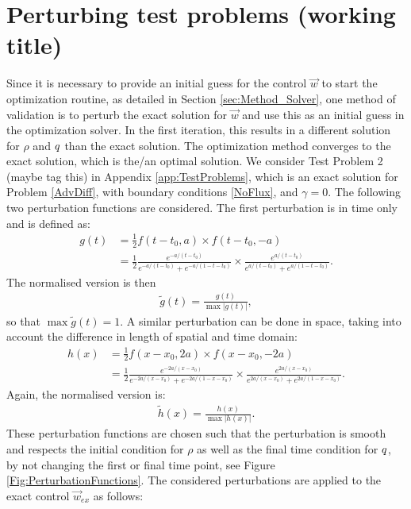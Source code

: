 \section{Perturbing test problems (working title)} \label{app:TestProblemsPerturbed}

Since it is necessary to provide an initial guess for the control $\vec{w}$ to start the optimization routine, as detailed in Section \ref{sec:Method_Solver}, one method of validation is to perturb the exact solution for $\vec{w}$ and use this as an initial guess in the optimization solver. In the first iteration, this results in a different solution for $\rho$ and $q$ than the exact solution. The optimization method  converges to the exact solution, which is the/an optimal solution. We consider Test Problem 2 (maybe tag this) in Appendix \ref{app:TestProblems}, which is an exact solution for Problem \eqref{AdvDiff}, with boundary conditions \eqref{NoFlux}, and $\gamma = 0$. 
The following two perturbation functions are considered. The first perturbation is in time only and is defined as:
\begin{align*}
g(t) &= \frac{1}{2} f(t-t_0, a) \times f(t-t_0, -a)\\
&= \frac{1}{2} \frac{e^{-a/(t-t_0)}}{e^{-a/(t-t_0)} + e^{-a/(1-t -t_0)}} \times \frac{e^{a/(t-t_0)}}{e^{a/(t-t_0)} + e^{a/(1-t - t_0)}}.
\end{align*}
The normalised version is then 
\begin{align*}
\tilde g(t) = \frac{g(t)}{\max{|{g(t)}|}},
\end{align*}
so that $\max{\tilde g(t)} =1$.
A similar perturbation can be done in space, taking into account the difference in length of spatial and time domain:
\begin{align*}
h(x) &= \frac{1}{2} f(x-x_0, 2a) \times f(x-x_0, -2a)\\
&= \frac{1}{2} \frac{e^{-2a/(x-x_0)}}{e^{-2a/(x-x_0)} + e^{-2a/(1-x-x_0)}} \times \frac{e^{2a/(x-x_0)}}{e^{2a/(x-x_0)} + e^{2a/(1-x-x_0)}}.
\end{align*}
Again, the normalised version is:
\begin{align*}
\tilde h(x) = \frac{h(x)}{\max{|{h(x)}|}}.
\end{align*}
These perturbation functions are chosen such that the perturbation is smooth and respects the initial condition for $\rho$ as well as the final time condition for $q$, by not changing the first or final time point, see Figure \ref{Fig:PerturbationFunctions}.
The considered perturbations are applied to the exact control $\vec{w}_{ex}$ as follows:
